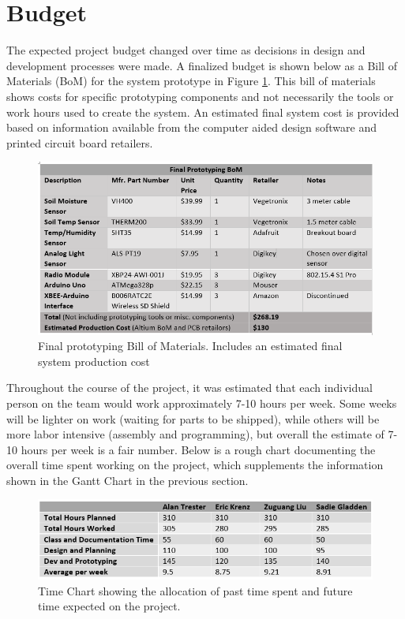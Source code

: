 \documentclass{report}
\begin{document}
\newpage
\section{Budget}
The expected project budget changed over time as decisions in design and development processes were made. A finalized budget is shown below as a Bill of Materials (BoM) for the system prototype in Figure \ref{fig:bom}. This bill of materials shows costs for specific prototyping components and not necessarily the tools or work hours used to create the system. An estimated final system cost is provided based on information available from the computer aided design software and printed circuit board retailers.
\begin{figure}[H]
    \centering
    \includegraphics[width=15cm]{PNGs/BoM.PNG}
    \caption{Final prototyping Bill of Materials. Includes an estimated final system production cost}
    \label{fig:bom}
\end{figure}





\clearpage
{}
\recalctypearea
\addtolength{\hoffset}{+4.0cm}

Throughout the course of the project, it was estimated that each individual person on the team would work approximately 7-10 hours per week. Some weeks will be lighter on work (waiting for parts to be shipped), while others will be more labor intensive (assembly and programming), but overall the estimate of 7-10 hours per week is a fair number. Below is a rough chart documenting the overall time spent working on the project, which supplements the information shown in the Gantt Chart in the previous section.\\

\begin{figure}[H]
    \centering
    \includegraphics[width=15cm]{PNGs/TimeChart.PNG}
    \caption{Time Chart showing the allocation of past time spent and future time expected  on the project.}
    \label{fig:time_chart}
\end{figure}
\end{document}
